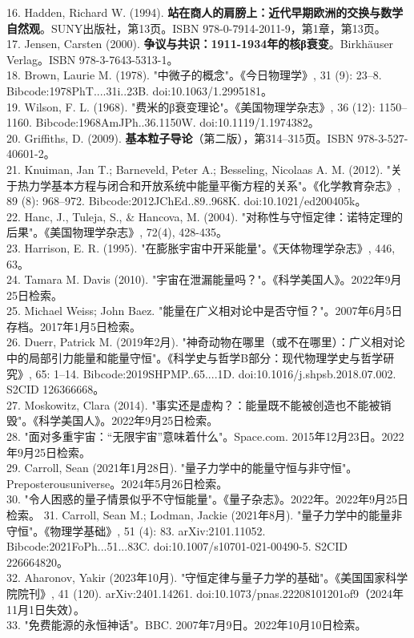 16. Hadden, Richard W. (1994). \textbf{站在商人的肩膀上：近代早期欧洲的交换与数学自然观}。SUNY出版社，第13页。ISBN 978-0-7914-2011-9，第1章，第13页。\\
17. Jensen, Carsten (2000). \textbf{争议与共识：1911-1934年的核β衰变}。Birkhäuser Verlag。ISBN 978-3-7643-5313-1。\\
18. Brown, Laurie M. (1978). "中微子的概念"。《今日物理学》, 31 (9): 23–8. Bibcode:1978PhT....31i..23B. doi:10.1063/1.2995181。\\
19. Wilson, F. L. (1968). "费米的β衰变理论"。《美国物理学杂志》, 36 (12): 1150–1160. Bibcode:1968AmJPh..36.1150W. doi:10.1119/1.1974382。\\
20. Griffiths, D. (2009). \textbf{基本粒子导论}（第二版），第314–315页。ISBN 978-3-527-40601-2。\\
21. Knuiman, Jan T.; Barneveld, Peter A.; Besseling, Nicolaas A. M. (2012). "关于热力学基本方程与闭合和开放系统中能量平衡方程的关系"。《化学教育杂志》, 89 (8): 968–972. Bibcode:2012JChEd..89..968K. doi:10.1021/ed200405k。\\
22. Hanc, J., Tuleja, S., & Hancova, M. (2004). "对称性与守恒定律：诺特定理的后果"。《美国物理学杂志》, 72(4), 428-435。\\
23. Harrison, E. R. (1995). "在膨胀宇宙中开采能量"。《天体物理学杂志》, 446, 63。\\
24. Tamara M. Davis (2010). "宇宙在泄漏能量吗？"。《科学美国人》。2022年9月25日检索。\\
25. Michael Weiss; John Baez. "能量在广义相对论中是否守恒？"。2007年6月5日存档。2017年1月5日检索。\\
26. Duerr, Patrick M. (2019年2月). "神奇动物在哪里（或不在哪里）：广义相对论中的局部引力能量和能量守恒"。《科学史与哲学B部分：现代物理学史与哲学研究》, 65: 1–14. Bibcode:2019SHPMP..65....1D. doi:10.1016/j.shpsb.2018.07.002. S2CID 126366668。\\
27. Moskowitz, Clara (2014). "事实还是虚构？：能量既不能被创造也不能被销毁"。《科学美国人》。2022年9月25日检索。\\
28. "面对多重宇宙：“无限宇宙”意味着什么"。Space.com. 2015年12月23日。2022年9月25日检索。\\
29. Carroll, Sean (2021年1月28日). "量子力学中的能量守恒与非守恒"。Preposterousuniverse。2024年5月26日检索。\\
30. "令人困惑的量子情景似乎不守恒能量"。《量子杂志》。2022年。2022年9月25日检索。
31. Carroll, Sean M.; Lodman, Jackie (2021年8月). "量子力学中的能量非守恒"。《物理学基础》, 51 (4): 83. arXiv:2101.11052. Bibcode:2021FoPh...51...83C. doi:10.1007/s10701-021-00490-5. S2CID 226664820。\\
32. Aharonov, Yakir (2023年10月). "守恒定律与量子力学的基础"。《美国国家科学院院刊》, 41 (120). arXiv:2401.14261. doi:10.1073/pnas.22208101201of9（2024年11月1日失效）。\\
33. "免费能源的永恒神话"。BBC. 2007年7月9日。2022年10月10日检索。\\